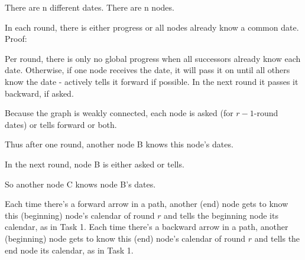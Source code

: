 \documentclass[12pt,a4paper,titlepage,oneside]{article}
\begin{document}
There are n different dates. There are n nodes. 

In each round, there is either progress or all nodes already know a common date. Proof:

Per round, there is only no global progress when all successors already know
each date. Otherwise, if one node receives the date, it will pass it on
until all others know the date - actively tells it forward if possible. In the next round it passes it backward, if asked.\par
Because the graph is weakly connected, each node is asked (for $r-1$-round dates) or tells forward or both.\par
Thus after one round, another node B knows this node's dates.\par
In the next round, node B is either asked or tells.\par
So another node C knows node B's dates.\par

Each time there's a forward arrow in a path, another (end) node gets to know this (beginning) node's calendar of round $r$ and tells the beginning node its calendar, as in Task 1.
Each time there's a backward arrow in a path, another (beginning) node gets to know this (end) node's calendar of round $r$ and tells the end node its calendar, as in Task 1.

\newpage
\appendix
\end{document}
